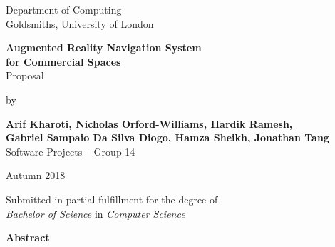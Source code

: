 \documentclass[12pt]{report}
\begin{document}
\begin{titlepage}
    \begin{center}
        \vspace*{1cm}
        Department of Computing\\
        Goldsmiths, University of London\\

        \vspace*{3.25cm}

        \textbf{\LARGE Augmented Reality Navigation System\\}
        \vspace*{0.20cm}           
        \textbf{\LARGE for Commercial Spaces}\\
        \vspace*{0.55cm}           
        {\large Proposal}\\
        \vspace*{0.15cm}           

        \vspace*{2cm}
        by\\
        \vspace*{0.25cm}   

        \textbf{Arif Kharoti, Nicholas Orford-Williams, Hardik Ramesh,\\}
        \textbf{Gabriel Sampaio Da Silva Diogo, Hamza Sheikh, Jonathan Tang\\}
        \vspace*{0.1cm}    
        Software Projects – Group 14\\  

        \vspace{2cm}

        Autumn 2018
        \vfill

        Submitted in partial fulfillment for the degree of\\
        \textit{Bachelor of Science} in \textit{Computer Science}

        \vspace{1.5cm}

    \end{center}
\end{titlepage}

\thispagestyle{plain}


\begin{center}        
    \large
    \textbf{Abstract}\\
\end{center}
\end{document}
